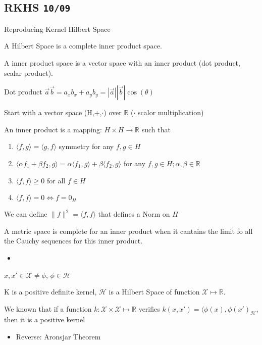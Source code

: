 \documentclass[10pt,portrait]{article}
\providecommand{\tightlist}{%
  \setlength{\itemsep}{0pt}\setlength{\parskip}{0pt}}
\begin{document}
\hypertarget{rkhs-1009}{%
\subsection{\texorpdfstring{RKHS
\texttt{10/09}}{RKHS 10/09}}\label{rkhs-1009}}

Reproducing Kernel Hilbert Space

A Hilbert Space is a complete inner product space.

A inner product space is a vector space with an inner product (dot
product, scalar product).

Dot product \(\vec a\vec b=a_xb_x+a_yb_y=|\vec a||\vec b|\cos(\theta)\)

Start with a vector space (H,+,\(\cdot\)) over \(\mathbb{R}\) (\(\cdot\)
scalor multiplication)

An inner product is a mapping: \(H\times H\to\mathbb{R}\) such that

\begin{enumerate}
\def\labelenumi{\arabic{enumi}.}
\item
  \(\langle f,g\rangle=\langle g,f\rangle\) symmetry for any
  \(f,g\in H\)
\item
  \(\langle\alpha f_1+\beta f_2,g\rangle=\alpha\langle f_1,g\rangle+\beta\langle f_2,g\rangle\)
  for any \(f,g\in H;\alpha,\beta\in\mathbb{R}\)
\item
  \(\langle f,f\rangle\ge0\) for all \(f\in H\)
\item
  \(\langle f,f\rangle=0\iff f=0_H\)
\end{enumerate}

We can define \(\|f\|^2=\langle f,f\rangle\) that defines a Norm on
\(H\)

A metric space is complete for an inner product when it cantains the
limit fo all the Cauchy sequences for this inner product.

\begin{itemize}
\item
\end{itemize}

\(x,x'\in\mathcal{X}\neq\phi\), \(\phi\in\mathcal{H}\)

K is a positive definite kernel, \(\mathcal{H}\) is a Hilbert Space of
function \(\mathcal{X}\mapsto\mathbb{R}\).

We known that if a function
\(k: \mathcal{X}\times\mathcal{X}\mapsto\mathbb{R}\) verifies
\(k(x,x')=\langle\phi(x),\phi(x')_{\mathcal{H}}\), then it is a positive
kernel

\begin{itemize}
\tightlist
\item
  Reverse: Aronsjar Theorem
\end{itemize}
\end{document}
